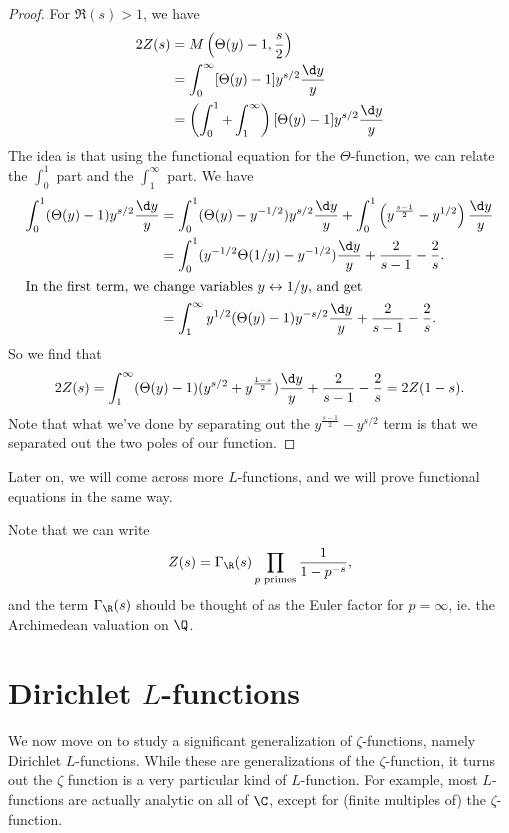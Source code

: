 \documentclass[a4paper]{article}
\begin{document}
\begin{proof}
  For $\Re(s) > 1$, we have
  \begin{align*}
    2Z(s) &= M\left(\Theta(y) - 1, \frac{s}{2}\right) \\
    &= \int_0^\infty [\Theta(y) - 1] y^{s/2} \frac{\d y}{y}\\
    &= \left(\int_0^1 + \int_1^\infty\right)[\Theta(y) - 1] y^{s/2} \frac{\d y}{y}
  \end{align*}
  The idea is that using the functional equation for the $\Theta$-function, we can relate the $\int_0^1$ part and the $\int_1^\infty$ part. We have
  \begin{align*}
    \int_0^1 (\Theta(y) - 1) y^{s/2} \frac{\d y}{y} &= \int_0^1 (\Theta(y) - y^{-1/2}) y^{s/2} \frac{\d y}{y} + \int_0^1 \left(y^{\frac{s - 1}{2}} - y^{1/2}\right) \frac{\d y}{y}\\
    &= \int_0^1 (y^{-1/2} \Theta(1/y) - y^{-1/2}) \frac{\d y}{y} + \frac{2}{s - 1} - \frac{2}{s}.\\
    \intertext{In the first term, we change variables $y \leftrightarrow 1/y$, and get}
    &= \int_1^\infty y^{1/2} (\Theta(y) - 1) y^{-s/2} \frac{\d y}{y} + \frac{2}{s - 1} - \frac{2}{s}.
  \end{align*}
  So we find that
  \[
    2Z(s) = \int_1^\infty (\Theta(y) - 1)(y^{s/2} + y^{\frac{1 - s}{2}}) \frac{\d y}{y} + \frac{2}{s - 1} - \frac{2}{s} = 2Z(1 - s).
  \]
  Note that what we've done by separating out the $y^{\frac{s - 1}{2}} - y^{s/2}$ term is that we separated out the two poles of our function.
\end{proof}
Later on, we will come across more $L$-functions, and we will prove functional equations in the same way.

Note that we can write
\[
  Z(s) = \Gamma_\R(s) \prod_{p\text{ primes}} \frac{1}{1 - p^{-s}},
\]
and the term $\Gamma_\R(s)$ should be thought of as the Euler factor for $p = \infty$, ie. the Archimedean valuation on $\Q$.

\section{Dirichlet \texorpdfstring{$L$}{L}-functions}
We now move on to study a significant generalization of $\zeta$-functions, namely Dirichlet $L$-functions. While these are generalizations of the $\zeta$-function, it turns out the $\zeta$ function is a very particular kind of $L$-function. For example, most $L$-functions are actually analytic on all of $\C$, except for (finite multiples of) the $\zeta$-function.
\end{document}
